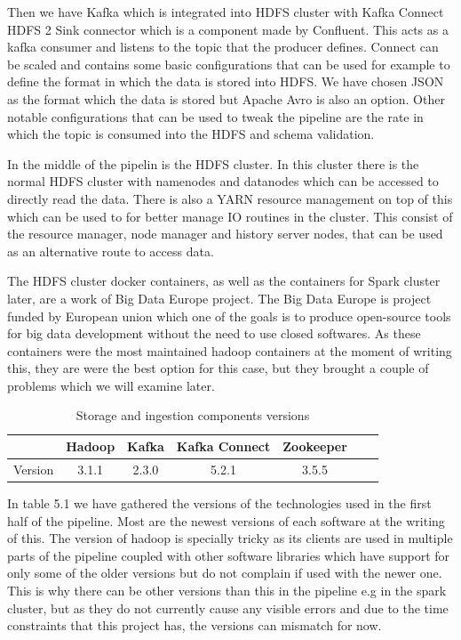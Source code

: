 Then we have Kafka which is integrated into HDFS cluster with Kafka Connect HDFS 2 Sink connector which is a component made by Confluent.
This acts as a kafka consumer and listens to the topic that the producer defines.
Connect can be scaled and contains some basic configurations that can be used for example to define the format in which the data is stored into HDFS.
We have chosen JSON as the format which the data is stored but Apache Avro is also an option.
Other notable configurations that can be used to tweak the pipeline are the rate in which the topic is consumed into the HDFS and schema validation.

In the middle of the pipelin is the HDFS cluster.
In this cluster there is the normal HDFS cluster with namenodes and datanodes which can be accessed to directly read the data.
There is also a YARN resource management on top of this which can be used to for better manage IO routines in the cluster.
This consist of the resource manager, node manager and history server nodes, that can be used as an alternative route to access data.

The HDFS cluster docker containers, as well as the containers for Spark cluster later, are a work of Big Data Europe project.
The Big Data Europe is project funded by European union which one of the goals is to produce open-source tools for big data development without the need to use closed softwares.\cite{bigdataeurope}
As these containers were the most maintained hadoop containers at the moment of writing this, they are were the best option for this case, but they brought a couple of problems which we will examine later.

\begin{table}[! htbp]\centering
    \caption{Storage and ingestion components versions}
    \begin{threeparttable}
        \begin{tabular}{|c|c|c|c|c|c|c|} 
        \hline
        & Hadoop & Kafka & Kafka Connect & Zookeeper \\ \hline
        Version & 3.1.1 & 2.3.0 & 5.2.1 & 3.5.5\\
        \hline
        \end{tabular}
    \end{threeparttable}
\end{table}

In table 5.1 we have gathered the versions of the technologies used in the first half of the pipeline.
Most are the newest versions of each software at the writing of this.
The version of hadoop is specially tricky as its clients are used in multiple parts of the pipeline coupled with other software libraries which have support for only some of the older versions but do not complain if used with the newer one.
This is why there can be other versions than this in the pipeline e.g in the spark cluster, but as they do not currently cause any visible errors and due to the time constraints that this project has, the versions can mismatch for now.

